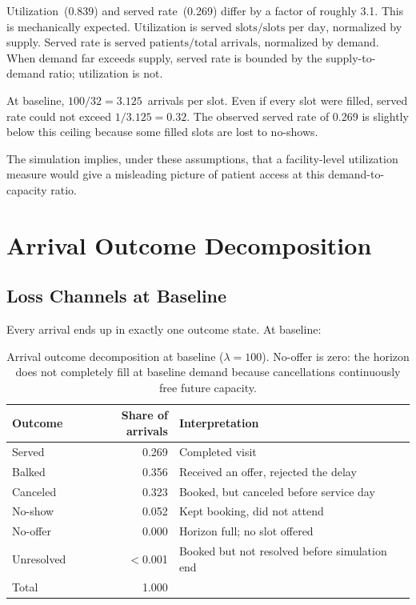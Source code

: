 \documentclass[11pt]{article}
\begin{document}
Utilization~(0.839) and served rate~(0.269) differ by a factor of roughly
3.1. This is mechanically expected. Utilization is
$\text{served slots} / \text{slots per day}$, normalized by supply.
Served rate is $\text{served patients} / \text{total arrivals}$, normalized
by demand. When demand far exceeds supply, served rate is bounded by the
supply-to-demand ratio; utilization is not.

At baseline, $100/32 = 3.125$~arrivals per slot. Even if every slot were
filled, served rate could not exceed $1/3.125 = 0.32$. The observed
served rate of 0.269 is slightly below this ceiling because some filled slots
are lost to no-shows.

The simulation implies, under these assumptions, that a facility-level
utilization measure would give a misleading picture of patient access at
this demand-to-capacity ratio.

\section{Arrival Outcome Decomposition}
\label{sec:decomp}

\subsection{Loss Channels at Baseline}

Every arrival ends up in exactly one outcome state. At baseline:

\begin{table}[H]
\centering
\renewcommand{\arraystretch}{1.12}
\begin{tabular}{lrp{}}
\toprule
Outcome & Share of arrivals & Interpretation \\
\midrule
Served & 0.269 & Completed visit \\
Balked & 0.356 & Received an offer, rejected the delay \\
Canceled & 0.323 & Booked, but canceled before service day \\
No-show & 0.052 & Kept booking, did not attend \\
No-offer & 0.000 & Horizon full; no slot offered \\
Unresolved & $<$0.001 & Booked but not resolved before simulation end \\
\midrule
Total & 1.000 & \\
\bottomrule
\end{tabular}
\caption{Arrival outcome decomposition at baseline ($\lambda = 100$).
No-offer is zero: the horizon does not completely fill at baseline demand
because cancellations continuously free future capacity.}
\label{tab:decomp}
\end{table}
\end{document}
